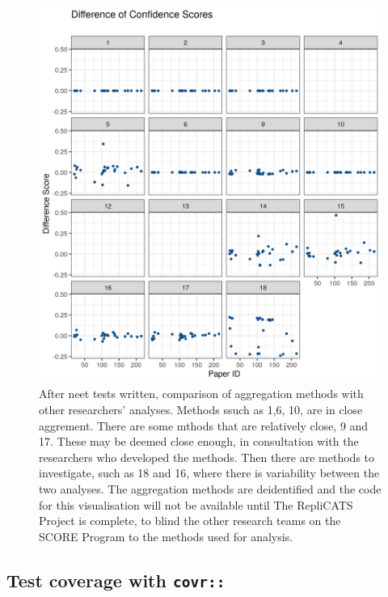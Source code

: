 \documentclass[
]{article}
\begin{document}
\begin{figure}

{\centering \includegraphics[width=26.68in]{cs_diff_by_method_id} 

}

\caption{\label{fig:aggregators} After neet tests written, comparison of aggregation methods with other researchers' analyses. Methods ssuch as 1,6, 10, are in close aggrement. There are some mthods that are relatively close, 9 and 17. These may be deemed close enough, in consultation with the researchers who developed the methods. Then there are methods to investigate, such as 18 and 16, where there is variability between the two analyses. The aggregation methods are deidentified and the code for this visualisation will not be available until The RepliCATS Project is complete, to blind the other research teams on the SCORE Program to the methods used for analysis.}\label{fig:aggregators}
\end{figure}

\hypertarget{test-coverage-with-covr}{%
\subsection{\texorpdfstring{Test coverage with
\texttt{covr::}}{Test coverage with covr::}}\label{test-coverage-with-covr}}
\end{document}
